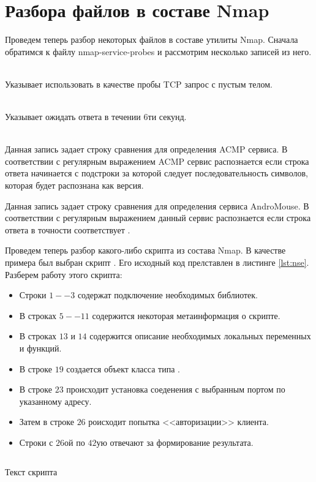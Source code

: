 \section{Разбора файлов в составе Nmap}

Проведем теперь разбор некоторых файлов в составе утилиты Nmap. Сначала обратимся к файлу nmap-service-probes и рассмотрим несколько 
записей из него.

\begin{description}
    \item {} \hfill \\
        Указывает использовать в качестве пробы TCP запрос с пустым телом.
    \item {} \hfill \\
        Указывает ожидать ответа в течении $6$ти секунд.
    \item {} \hfill \\
        Данная запись задает строку сравнения для определения ACMP сервиса. В соответствии с регулярным выражением ACMP сервис 
        распознается если строка ответа начинается с подстроки  за которой следует последовательность 
        символов, которая будет распознана как версия.
    \item {}
        Данная запись задает строку сравнения для определения сервиса AndroMouse. В соответствии с регулярным выражением данный сервис 
        распознается если строка ответа в точности соответствует .
\end{description}

Проведем теперь разбор какого-либо скрипта из состава Nmap. В качестве примера был выбран скрипт . Его исходный 
код прелставлен в листинге \ref{lst:nse}. Разберем работу этого скрипта:
\begin{itemize}
    \item Строки $1 -- 3$ содержат подключение необходимых библиотек.
    \item В строках $5 -- 11$ содержится некоторая метаинформация о скрипте.
    \item В строках $13$ и $14$ содержится описание необходимых локальных переменных и функций.
    \item В строке $19$ создается объект класса типа . 
    \item В строке $23$ происходит установка соеденения с выбранным портом по указанному адресу.
    \item Затем в строке $26$ роисходит попытка <<авторизации>> клиента. 
    \item Строки с $26$ой по $42$ую отвечают за формирование результата.
\end{itemize}

\begin{listing}[H]
    \inputminted{console}{resources/18_nse}
    \caption{Текст скрипта }
    \label{lst:nse}
\end{listing}